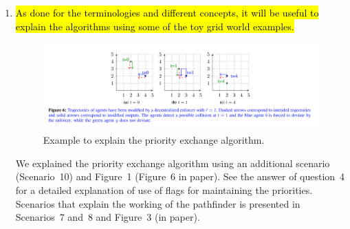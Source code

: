 \documentclass{article}[12pt]
\begin{document}
\begin{enumerate}
\item \hl{As done for the terminologies and different concepts, it will be useful to explain the algorithms using some of the toy grid world examples.}


\begin{figure}[h]
    \includegraphics[scale=0.8]{fig6.png}
    \caption{Example to explain the priority exchange algorithm.}
\end{figure}

We explained the priority exchange algorithm using an additional scenario (Scenario~10) and Figure~1 (Figure~6 in paper). See the answer of question~4 for a detailed explanation of use of flags for maintaining the priorities. Scenarios that explain the working of the pathfinder is presented in Scenarios~7 and~8 and Figure~3 (in paper).


\end{enumerate}
\end{document}
